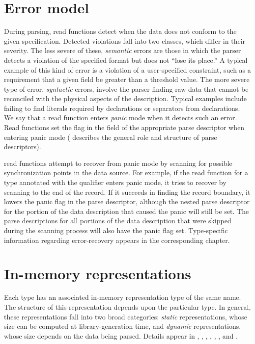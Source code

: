 


\section{Error model}
\label{sec:common-error-model}
During parsing, \pads{} read functions detect when the data does not
conform to the given specification.  Detected violations fall into two
classes, which differ in their severity.  The less severe of these,
\textit{semantic} errors are those in which the parser detects a
violation of the specified format but does not ``lose its place.''  A
typical example of this kind of error is a violation of a
user-specified constraint, such as a requirement that a given field be
greater than a threshold value.  The more severe type of error,
\textit{syntactic} errors, involve the parser finding raw data that
cannot be reconciled with the physical aspects of the description.
Typical examples include failing to find literals required by
\Pstruct{} declarations or separators from \Parray{} declarations. We
say that a read function enters \textit{panic} mode when it detects
such an error. Read functions set the  flag in the
 field of the appropriate parse descriptor when entering
panic mode ( describes the general
role and structure of parse descriptors).

\pads{} read functions attempt to recover from panic mode by scanning
for possible synchronization points in the data source.
For example, if the read function for a \pads{} type  annotated with
the \Precord{} qualifier enters panic mode, it tries to
recover by scanning to the end of the record.  If it succeeds in
finding the record boundary, it lowers the panic flag in the 
parse descriptor, although the nested parse descriptor for the portion
of the data description that caused the panic will still be set.  The parse
descriptions for all portions of the data description that were
skipped during the scanning process will also have the panic flag set.
Type-specific information regarding error-recovery appears in the
corresponding chapter.



\section{In-memory representations}
\label{sec:common-rep}
Each \PADS{} type  has an associated in-memory representation
type of the same name.  The structure of this representation depends
upon the particular \PADS{} type.  
In general, these representations fall into two broad categories:
\textit{static} representations, whose size can be computed at
library-generation time, and \textit{dynamic} representations, whose size 
depends on the data being parsed. 
Details appear in 
, ,
, , 
, , 
and .

